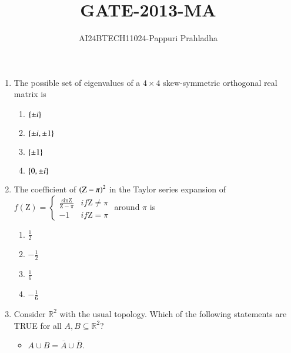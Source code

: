 \documentclass[journal]{IEEEtran}
\begin{document}

\vspace{3cm}

\title{GATE-2013-MA}
\author{AI24BTECH11024-Pappuri Prahladha}
{\let\newpage\relax\maketitle}

\renewcommand{\thefigure}{\theenumi}
\renewcommand{\thetable}{\theenumi}
\setlength{\intextsep}{10pt} %


\renewcommand{\thetable}{\theenumi}
\begin{enumerate}
\item  The possible set of eigenvalues of a $ 4 \times 4 $ skew-symmetric orthogonal real matrix is
\begin{multicols}{4}
\begin{enumerate}
    \item $\left\{\pm i\right\}$ 
    \item $\left\{\pm i,\pm 1\right\}$
    \item $\left\{\pm 1\right\}$
    \item $\left\{0,\pm i\right\}$
\end{enumerate}
\end{multicols}
\item The coefficient of $ \left(\text{Z} - \pi\right)^{2}$ in the Taylor series expansion of
$
f(\text{Z}) = \begin{cases} \frac{\sin \text{Z}}{\text{Z} - \pi} & if  \text{Z} \neq \pi \\ -1 & if  \text{Z} = \pi \end{cases}
$
around $\pi$ is
\begin{multicols}{4}
\begin{enumerate}
    \item $\frac{1}{2}$ 
    \item $ -\frac{1}{2} $
    \item $ \frac{1}{6}$ 
    \item $ -\frac{1}{6}$ 
\end{enumerate}
\end{multicols}
\item  Consider $ \mathbb{R}^{2} $ with the usual topology. Which of the following statements are TRUE for all $ A, B \subseteq \mathbb{R}^{2}$?
\begin{itemize}
    \item \( A \cup B = \overline{A} \cup \overline{B} \).

\end{itemize}
\end{enumerate}
\end{document}
